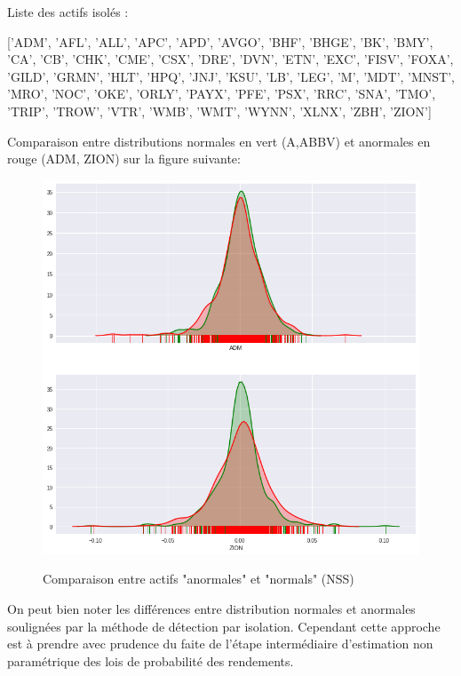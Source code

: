 Liste des actifs isolés :

['ADM', 'AFL', 'ALL', 'APC', 'APD', 'AVGO', 'BHF', 'BHGE', 'BK', 'BMY',
       'CA', 'CB', 'CHK', 'CME', 'CSX', 'DRE', 'DVN', 'ETN', 'EXC', 'FISV',
       'FOXA', 'GILD', 'GRMN', 'HLT', 'HPQ', 'JNJ', 'KSU', 'LB', 'LEG', 'M',
       'MDT', 'MNST', 'MRO', 'NOC', 'OKE', 'ORLY', 'PAYX', 'PFE', 'PSX', 'RRC',
       'SNA', 'TMO', 'TRIP', 'TROW', 'VTR', 'WMB', 'WMT', 'WYNN', 'XLNX',
       'ZBH', 'ZION']

Comparaison entre distributions normales en vert (A,ABBV) et anormales en rouge (ADM, ZION) sur la figure suivante:

\begin{figure}[H]
\centering
\caption{Comparaison entre actifs "anormales" et "normals" (NSS)}
   \includegraphics[scale=0.7]{img/anomalie_vs_normal_nss.png}
 \label{anormm}
\end{figure}

On peut bien noter les différences entre distribution normales et anormales soulignées par la méthode de détection par isolation. Cependant cette approche est à prendre avec prudence du faite de l'étape intermédiaire d'estimation non paramétrique des lois de probabilité des rendements.



